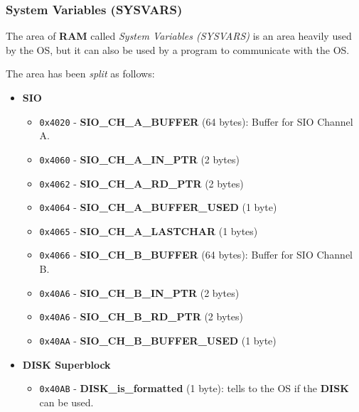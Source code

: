         \subsubsection{System Variables (SYSVARS)}
        \label{sec:ram_memmap}

        The area of \textbf{RAM} called \textit{System Variables (SYSVARS)} is an 
        area heavily used by the OS, but it can also be used by a program to
        communicate with the OS.

        The area has been \textit{split} as follows:

        \begin{itemize}
            \item \textbf{SIO}
            \begin{itemize}
                \item \texttt{0x4020} - \textbf{SIO\_CH\_A\_BUFFER} (64 bytes):
                Buffer for SIO Channel A.
                \item \texttt{0x4060} - \textbf{SIO\_CH\_A\_IN\_PTR} (2 bytes)
                \item \texttt{0x4062} - \textbf{SIO\_CH\_A\_RD\_PTR} (2 bytes)
                \item \texttt{0x4064} - \textbf{SIO\_CH\_A\_BUFFER\_USED} (1 byte)
                \item \texttt{0x4065} - \textbf{SIO\_CH\_A\_LASTCHAR} (1 bytes)
                \item \texttt{0x4066} - \textbf{SIO\_CH\_B\_BUFFER} (64 bytes):
                Buffer for SIO Channel B.
                \item \texttt{0x40A6} - \textbf{SIO\_CH\_B\_IN\_PTR} (2 bytes)
                \item \texttt{0x40A6} - \textbf{SIO\_CH\_B\_RD\_PTR} (2 bytes)
                \item \texttt{0x40AA} - \textbf{SIO\_CH\_B\_BUFFER\_USED} (1 byte)
            \end{itemize}
            \item \textbf{DISK Superblock}
            \begin{itemize}
                \item \texttt{0x40AB} - \textbf{DISK\_is\_formatted} (1 byte): tells
                to the OS if the \textbf{DISK} can be used.
                \begin{itemize}

\end{itemize}
\end{itemize}
\end{itemize}

